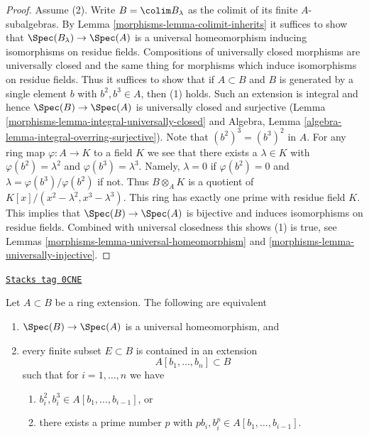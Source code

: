 \begin{proof}
\medskip\noindent
Assume (2). Write $B = \colim B_\lambda$ as the colimit of its
finite $A$-subalgebras.
By Lemma \ref{morphisms-lemma-colimit-inherits} it suffices to show
that $\Spec(B_\lambda) \to \Spec(A)$ is a
universal homeomorphism inducing isomorphisms on residue fields.
Compositions of universally closed morphisms are universally closed
and the same thing for morphisms which induce isomorphisms on residue fields.
Thus it suffices to show that if $A \subset B$ and $B$ is generated
by a single element $b$ with $b^2, b^3 \in A$, then (1) holds.
Such an extension is integral and hence $\Spec(B) \to \Spec(A)$ is
universally closed and surjective
(Lemma \ref{morphisms-lemma-integral-universally-closed} and
Algebra, Lemma \ref{algebra-lemma-integral-overring-surjective}).
Note that $(b^2)^3 = (b^3)^2$ in $A$.
For any ring map $\varphi : A \to K$ to a field $K$ we see that there
exists a $\lambda \in K$ with $\varphi(b^2) = \lambda^2$ and
$\varphi(b^3) = \lambda^3$. Namely, $\lambda = 0$ if $\varphi(b^2) = 0$
and $\lambda = \varphi(b^3)/\varphi(b^2)$ if not. Thus
$B \otimes_A K$ is a quotient of $K[x]/(x^2 - \lambda^2, x^3 - \lambda^3)$.
This ring has exactly one prime with residue field $K$.
This implies that $\Spec(B) \to \Spec(A)$ is bijective and induces
isomorphisms on residue fields. Combined with universal closedness
this shows (1) is true, see Lemmas \ref{morphisms-lemma-universal-homeomorphism}
and \ref{morphisms-lemma-universally-injective}.
\end{proof}

\begin{proposition}
\label{morphisms-proposition-universal-homeomorphism}
\href{https://stacks.math.columbia.edu/tag/0CNE}{\texttt{Stacks tag 0CNE}}

Let $A \subset B$ be a ring extension. The following are equivalent
\begin{enumerate}
\item $\Spec(B) \to \Spec(A)$ is a universal homeomorphism, and
\item every finite subset $E \subset B$ is contained in an extension
$$
A[b_1, \ldots, b_n] \subset B
$$
such that for $i = 1, \ldots, n$ we have
\begin{enumerate}
\item $b_i^2, b_i^3 \in A[b_1, \ldots, b_{i - 1}]$, or
\item there exists a prime number $p$ with
$pb_i, b_i^p \in A[b_1, \ldots, b_{i - 1}]$.
\end{enumerate}
\end{enumerate}
\end{proposition}

